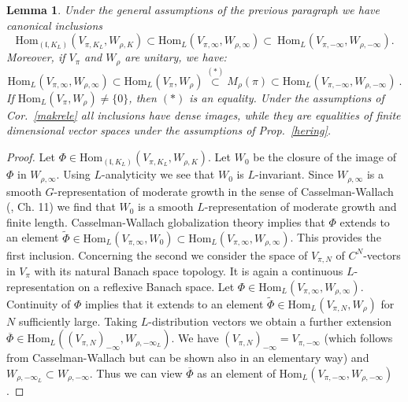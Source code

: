 \documentclass[10]{amsart}
\newtheorem{lem}[thm]{Lemma}
\theoremstyle{remark}
\theoremstyle{definition}
\numberwithin{equation}{section}
\newcommand{\Hom}{\mathrm{Hom}}
\newcommand{\fl}{{\mathfrak l}}
\newcommand{\be}{\begin{equation}}
\begin{document}
{\begin{lem}\label{sardine}
Under the general assumptions of the previous paragraph we have canonical inclusions
$$
 \Hom_{(\fl,K_L)}(V_{\pi,K_L},W_{\rho,K})\subset  \Hom_{L}(V_{\pi,\infty},W_{\rho,\infty})\subset\  \Hom_{L}(V_{\pi,-\infty},W_{\rho,-\infty}).
$$
Moreover, if $V_\pi$ and $W_\rho$ are unitary, we have:
$$ \Hom_{L}(V_{\pi,\infty},W_{\rho,\infty})\subset\Hom_{L}(V_{\pi},W_{\rho})\stackrel{(*)}{\subset}M_\rho(\pi)\subset  \Hom_{L}(V_{\pi,-\infty},W_{\rho,-\infty})\ .$$
If $\Hom_{L}(V_{\pi},W_{\rho})\ne\{0\}$, then $(*)$ is an equality. Under the assumptions of Cor.~\ref{makrele} all inclusions have dense images, while they are equalities
of finite dimensional vector spaces under the assumptions of Prop.~\ref{hering}.
\end{lem}
\begin{proof}
Let $\Phi\in   \Hom_{(\fl,K_L)}(V_{\pi,K_L},W_{\rho,K})$. Let $W_0$ be the closure of the image of $\Phi$ in $W_{\rho,\infty}$. Using $L$-analyticity we see that $W_0$ is $L$-invariant.
Since  $W_{\rho,\infty}$ is a smooth $G$-representation of moderate growth in the sense of Casselman-Wallach (\cite{Wa92}, Ch. 11) we find that $W_0$ is a smooth $L$-representation of moderate growth and finite length. Casselman-Wallach globalization theory implies that $\Phi$ extends to an element $\tilde\Phi\in   \Hom_{L}(V_{\pi,\infty},W_0)\subset
 \Hom_{L}(V_{\pi,\infty},W_{\rho,\infty})$. This provides the first inclusion. Concerning the second we consider the space of $V_{\pi,N}$ of $C^N$-vectors in $V_\pi$ with its natural Banach space topology. It is again a continuous $L$-representation on a reflexive Banach space. Let $\Phi\in\Hom_{L}(V_{\pi,\infty},W_{\rho,\infty})$. Continuity
of $\Phi$ implies that it extends to an element $\tilde \Phi\in  \Hom_{L}(V_{\pi,N},W_{\rho})$ for $N$ sufficiently large. Taking $L$-distribution vectors we obtain a further extension
$\overline \Phi\in \Hom_{L}((V_{\pi,N})_{-\infty},W_{\rho,-\infty_L})$. We have $(V_{\pi,N})_{-\infty}=V_{\pi,-\infty}$ (which follows
from Casselman-Wallach but can be shown also in an elementary way)  and $W_{\rho,-\infty_L}\subset W_{\rho,-\infty}$. Thus we can view $\overline\Phi$ as an element of $\Hom_{L}(V_{\pi,-\infty},W_{\rho,-\infty})$.


\end{proof}}
\end{document}
